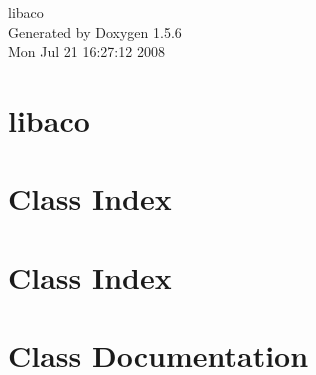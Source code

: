 \documentclass[a4paper]{book}
\begin{document}
\begin{titlepage}
\vspace*{7cm}
\begin{center}
{\Large libaco }\\
\vspace*{1cm}
{\large Generated by Doxygen 1.5.6}\\
\vspace*{0.5cm}
{\small Mon Jul 21 16:27:12 2008}\\
\end{center}
\end{titlepage}
\clearemptydoublepage
{}
\tableofcontents
\clearemptydoublepage
{}
\chapter{libaco}
\label{index}\hypertarget{index}{}
\chapter{Class Index}

\chapter{Class Index}

\chapter{Class Documentation}












\printindex
\end{document}
